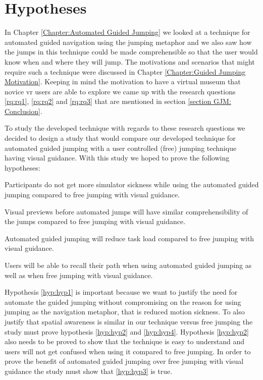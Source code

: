 \label{Chapter:Design and Procedure of the User Study}
\section{Hypotheses}
\label{section DPUS: Hypotheses}
In Chapter \ref{Chapter:Automated Guided Jumping} we looked at a technique for automated guided navigation using the jumping metaphor and we also saw how the jumps in this technique could be made comprehensible so that the user would know when and where they will jump. The motivations and scenarios that might require such a technique were discussed in Chapter \ref{Chapter:Guided Jumping Motivation}. Keeping in mind the motivation to have a virtual museum that novice \acrshort{vr} users are able to explore we came up with the research questions \cref{rq:rq1}, \cref{rq:rq2} and \cref{rq:rq3} that are mentioned in section \ref{section GJM: Conclusion}.

To study the developed technique with regards to these research questions we decided to design a study that would compare our developed technique for automated guided jumping with a user controlled (free) jumping technique having visual guidance. With this study we hoped to prove the following hypotheses:

\begin{hypothesis}
	\label{hyp:hyp1}
	Participants do not get more simulator sickness while using the automated guided jumping compared to free jumping with visual guidance.
\end{hypothesis}
\begin{hypothesis}
	\label{hyp:hyp2}
	Visual previews before automated jumps will have similar comprehensibility of the jumps compared to free jumping with visual guidance.
\end{hypothesis}
\begin{hypothesis}
	\label{hyp:hyp3}
	Automated guided jumping will reduce task load compared to free jumping with visual guidance.
\end{hypothesis}
\begin{hypothesis}
	\label{hyp:hyp4}
	Users will be able to recall their path when using automated guided jumping as well as when free jumping with visual guidance.
\end{hypothesis}

Hypothesis \cref{hyp:hyp1} is important because we want to justify the need for automate the guided jumping without compromising on the reason for using jumping as the navigation metaphor, that is reduced motion sickness. To also justify that spatial awareness is similar in our technique versus free jumping the study must prove hypothesis \cref{hyp:hyp2} and \cref{hyp:hyp4}. Hypothesis \cref{hyp:hyp2}  also needs to be proved to show that the technique is easy to understand and users will not get confused when using it compared to free jumping. In order to prove the benefit of automated guided jumping over free jumping with visual guidance the study must show that \cref{hyp:hyp3} is true.  

